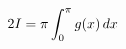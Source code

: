 \documentclass[preview]{standalone}
\begin{document}
\begin{align*}
\special{dvisvgm:raw <g id='unique000'>}2I=\pi\int_0^\pi g(x)\,dx\special{dvisvgm:raw </g>}
\end{align*}
\end{document}
